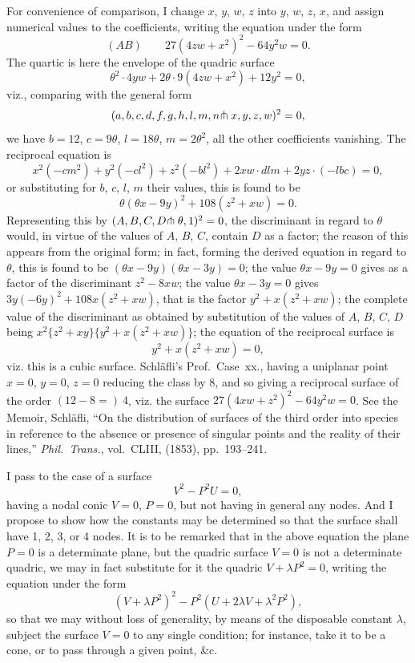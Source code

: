 \documentclass[11pt,a4paper]{article}
\begin{document}
For convenience of comparison, I change $x$, $y$, $w$, $z$ into $y$, $w$, $z$, $x$, and assign numerical values to the coefficients, writing the equation under the form
\[
(AB)\qquad 27(4zw + x^{2})^{2} - 64y^{2}w = 0.
\]
The quartic is here the envelope of the quadric surface
\[
\theta^{2} \cdot 4yw + 2\theta \cdot 9(4zw + x^{2}) + 12y^{2} = 0,
\]
viz., comparing with the general form
\[
(a,b,c,d,f,g,h,l,m,n\hspace{-0.2em}\pitchfork x,y,z,w)^{2} = 0,
\]
we have $b=12$, $c=9\theta$, $l=18\theta$, $m=2\theta^{2}$, all the other coefficients vanishing. The reciprocal equation is
\[
x^{2}(-cm^{2}) + y^{2}(-cl^{2}) + z^{2}(-bl^{2}) + 2xw \cdot dlm + 2yz \cdot (-lbc) = 0,
\]
or substituting for $b$, $c$, $l$, $m$ their values, this is found to be
\[
\theta(\theta x - 9y)^{2} + 108(z^{2} + xw) = 0.
\]
Representing this by $(A, B, C, D \hspace{-0.2em}\pitchfork \theta, 1)^{2} = 0$, the discriminant in regard to $\theta$ would, in virtue of the values of $A$, $B$, $C$, contain $D$ as a factor; the reason of this appears from the original form; in fact, forming the derived equation in regard to $\theta$, this is found to be $(\theta x - 9y)(\theta x - 3y) = 0$; the value $\theta x - 9y = 0$ gives as a factor of the discriminant $z^{2} - 8xw$; the value $\theta x - 3y = 0$ gives $3y(-6y)^{2} + 108x(z^{2} + xw)$, that is the factor $y^{2} + x(z^{2} + xw)$; the complete value of the discriminant as obtained by substitution of the values of $A$, $B$, $C$, $D$ being $x^{2}\{z^{2} + xy\}\{y^{2} + x(z^{2} + xw)\}$; the equation of the reciprocal surface is
\[
y^{2} + x(z^{2} + xw) = 0,
\]
viz. this is a cubic surface. Schl\"{a}fli's Prof.~Case~xx., having a uniplanar point $x=0$, $y=0$, $z=0$ reducing the class by 8, and so giving a reciprocal surface of the order $(12 - 8 =)\ 4$, viz. the surface $27(4xw + z^{2})^{2} - 64y^{2}w = 0$. See the Memoir, Schl\"{a}fli, ``On the distribution of surfaces of the third order into species in reference to the absence or presence of singular points and the reality of their lines,'' \textit{Phil.\ Trans.}, vol.~CLIII, (1853), pp.~193--241.

I pass to the case of a surface
\[
V^{2} - P^{2}U = 0,
\]
having a nodal conic $V=0$, $P=0$, but not having in general any nodes. And I propose to show how the constants may be determined so that the surface shall have 1, 2, 3, or 4 nodes. It is to be remarked that in the above equation the plane $P=0$ is a determinate plane, but the quadric surface $V=0$ is not a determinate quadric, we may in fact substitute for it the quadric $V + \lambda P^{2} = 0$, writing the equation under the form
\[
(V + \lambda P^{2})^{2} - P^{2}(U + 2\lambda V + \lambda^{2}P^{2}),
\]
so that we may without loss of generality, by means of the disposable constant $\lambda$, subject the surface $V=0$ to any single condition; for instance, take it to be a cone, or to pass through a given point, \&c.
\end{document}
